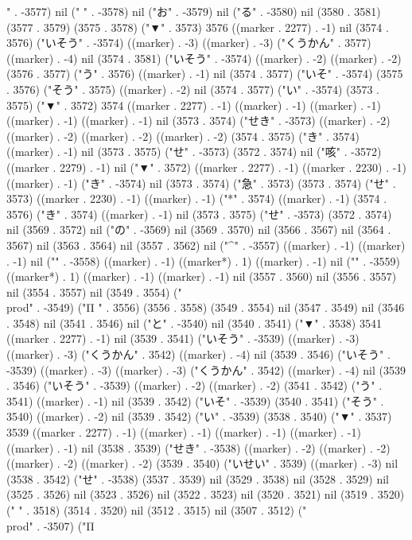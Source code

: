 " . -3577) nil (" " . -3578) nil ("お" . -3579) nil ("る" . -3580) nil (3580 . 3581) (3577 . 3579) (3575 . 3578) ("▼" . 3573) 3576 ((marker . 2277) . -1) nil (3574 . 3576) ("いそう" . -3574) ((marker) . -3) ((marker) . -3) ("くうかん" . 3577) ((marker) . -4) nil (3574 . 3581) ("いそう" . -3574) ((marker) . -2) ((marker) . -2) (3576 . 3577) ("う" . 3576) ((marker) . -1) nil (3574 . 3577) ("いそ" . -3574) (3575 . 3576) ("そう" . 3575) ((marker) . -2) nil (3574 . 3577) ("い" . -3574) (3573 . 3575) ("▼" . 3572) 3574 ((marker . 2277) . -1) ((marker) . -1) ((marker) . -1) ((marker) . -1) ((marker) . -1) nil (3573 . 3574) ("せき" . -3573) ((marker) . -2) ((marker) . -2) ((marker) . -2) ((marker) . -2) (3574 . 3575) ("き" . 3574) ((marker) . -1) nil (3573 . 3575) ("せ" . -3573) (3572 . 3574) nil ("咳" . -3572) ((marker . 2279) . -1) nil ("▼" . 3572) ((marker . 2277) . -1) ((marker . 2230) . -1) ((marker) . -1) ("き" . -3574) nil (3573 . 3574) ("急" . 3573) (3573 . 3574) ("せ" . 3573) ((marker . 2230) . -1) ((marker) . -1) ("*" . 3574) ((marker) . -1) (3574 . 3576) ("き" . 3574) ((marker) . -1) nil (3573 . 3575) ("せ" . -3573) (3572 . 3574) nil (3569 . 3572) nil ("の" . -3569) nil (3569 . 3570) nil (3566 . 3567) nil (3564 . 3567) nil (3563 . 3564) nil (3557 . 3562) nil ("^" . -3557) ((marker) . -1) ((marker) . -1) nil ("{" . -3558) ((marker) . -1) ((marker*) . 1) ((marker) . -1) nil ("}" . -3559) ((marker*) . 1) ((marker) . -1) ((marker) . -1) nil (3557 . 3560) nil (3556 . 3557) nil (3554 . 3557) nil (3549 . 3554) ("\\prod" . -3549) ("Π
" . 3556) (3556 . 3558) (3549 . 3554) nil (3547 . 3549) nil (3546 . 3548) nil (3541 . 3546) nil ("と" . -3540) nil (3540 . 3541) ("▼" . 3538) 3541 ((marker . 2277) . -1) nil (3539 . 3541) ("いそう" . -3539) ((marker) . -3) ((marker) . -3) ("くうかん" . 3542) ((marker) . -4) nil (3539 . 3546) ("いそう" . -3539) ((marker) . -3) ((marker) . -3) ("くうかん" . 3542) ((marker) . -4) nil (3539 . 3546) ("いそう" . -3539) ((marker) . -2) ((marker) . -2) (3541 . 3542) ("う" . 3541) ((marker) . -1) nil (3539 . 3542) ("いそ" . -3539) (3540 . 3541) ("そう" . 3540) ((marker) . -2) nil (3539 . 3542) ("い" . -3539) (3538 . 3540) ("▼" . 3537) 3539 ((marker . 2277) . -1) ((marker) . -1) ((marker) . -1) ((marker) . -1) ((marker) . -1) nil (3538 . 3539) ("せき" . -3538) ((marker) . -2) ((marker) . -2) ((marker) . -2) ((marker) . -2) (3539 . 3540) ("いせい" . 3539) ((marker) . -3) nil (3538 . 3542) ("せ" . -3538) (3537 . 3539) nil (3529 . 3538) nil (3528 . 3529) nil (3525 . 3526) nil (3523 . 3526) nil (3522 . 3523) nil (3520 . 3521) nil (3519 . 3520) (" " . 3518) (3514 . 3520) nil (3512 . 3515) nil (3507 . 3512) ("\\prod" . -3507) ("Π
